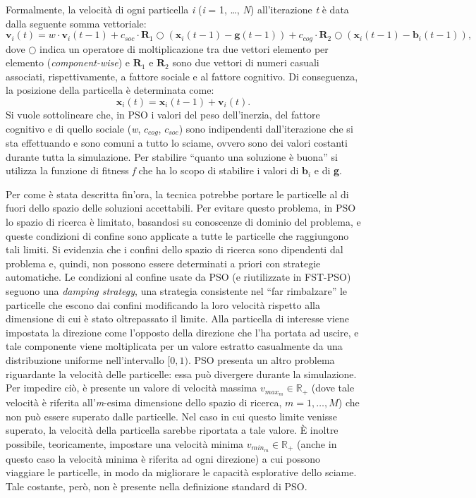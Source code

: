 Formalmente, la velocità di ogni particella \textit{i} (\textit{i} = 1, \dots, \textit{N}) all'iterazione \textit{t} è data dalla seguente somma vettoriale:
\[\textbf{v}_i(t) = \textit{w}\cdot\textbf{v}_i(t - 1) + c_{soc}\cdot\textbf{R}_1\bigcirc(\textbf{x}_i(t - 1) - \textbf{g}(t - 1)) + c_{cog}\cdot\textbf{R}_2\bigcirc(\textbf{x}_i(t - 1) - \textbf{b}_i(t - 1)),\]
dove $\bigcirc$ indica un operatore di moltiplicazione tra due vettori elemento per elemento (\textit{component-wise}) e $\textbf{R}_1$ e $\textbf{R}_2$ sono due vettori di numeri casuali associati, rispettivamente, a fattore sociale e al fattore cognitivo. Di conseguenza, la posizione della particella è determinata come: 
\[\textbf{x}_i(t) = \textbf{x}_i(t - 1) + \textbf{v}_i(t).\] 
Si vuole sottolineare che, in PSO i valori del peso dell'inerzia, del fattore cognitivo e di quello sociale (\textit{w}, $c_{cog}$, $c_{soc}$) sono indipendenti dall'iterazione che si sta effettuando e sono comuni a tutto lo sciame, ovvero sono dei valori costanti durante tutta la simulazione. Per stabilire “quanto una soluzione è buona” si utilizza la funzione di fitness \textit{f} che ha lo scopo di stabilire i valori di $\textbf{b}_i$ e di \textbf{g}.

Per come è stata descritta fin'ora, la tecnica potrebbe portare le particelle al di fuori dello spazio delle soluzioni accettabili. 
Per evitare questo problema, in PSO lo spazio di ricerca è limitato, basandosi su conoscenze di dominio del problema, e queste condizioni di confine sono applicate a tutte le particelle che raggiungono tali limiti.
Si evidenzia che i confini dello spazio di ricerca sono dipendenti dal problema e, quindi, non possono essere determinati a priori con strategie automatiche. 
Le condizioni al confine usate da PSO (e riutilizzate in FST-PSO) seguono una \textit{damping strategy}, una strategia consistente nel “far rimbalzare” le particelle che escono dai confini modificando la loro velocità rispetto alla dimensione di cui è stato oltrepassato il limite. 
Alla particella di interesse viene impostata la direzione come l'opposto della direzione che l'ha portata ad uscire, e tale componente viene moltiplicata per un valore estratto casualmente da una distribuzione uniforme nell'intervallo $[0, 1)$. 
PSO presenta un altro problema riguardante la velocità delle particelle: essa può divergere durante la simulazione. 
Per impedire ciò, è presente un valore di velocità massima $\textit{v}_{max_m} \in \mathbb{R}_+$ (dove tale velocità è riferita all'\textit{m}-esima dimensione dello spazio di ricerca, $\textit{m} = 1, \dots, \textit{M}$) che non può essere superato dalle particelle. 
Nel caso in cui questo limite venisse superato, la velocità della particella sarebbe riportata a tale valore. 
È inoltre possibile, teoricamente, impostare una velocità minima $\textit{v}_{min_m} \in \mathbb{R}_+$ (anche in questo caso la velocità minima è riferita ad ogni direzione) a cui possono viaggiare le particelle, in modo da migliorare le capacità esplorative dello sciame. 
Tale costante, però, non è presente nella definizione standard di PSO.

